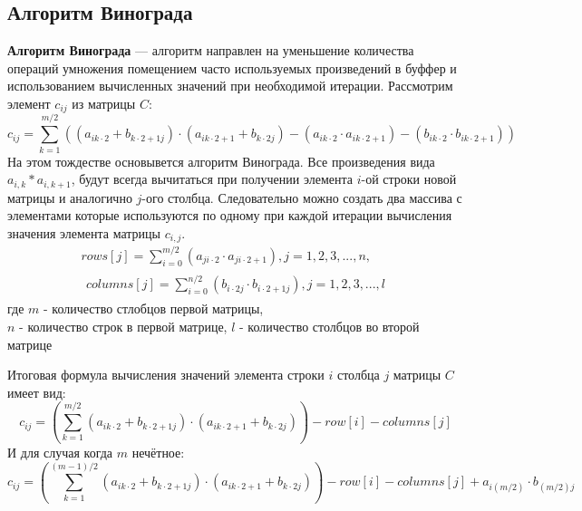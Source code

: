 \documentclass[14pt]{article}
\begin{document}
	\subsection{Алгоритм Винограда}
	\textbf{Алгоритм Винограда} --- алгоритм направлен на уменьшение количества операций умножения помещением часто используемых произведений в буффер и использованием вычисленных значений при необходимой итерации. Рассмотрим элемент  $c_{ij}$ из матрицы $C$:
	\begin{equation}
		c_{ij} = \sum_{k=1}^{m/2} ((a_{ik\cdot 2} + b_{k\cdot 2 + 1j})\cdot (a_{ik\cdot 2+1} + b_{k\cdot 2j}) -
		(a_{ik\cdot 2}\cdot a_{ik\cdot 2+1}) - (b_{ik\cdot 2}\cdot b_{ik\cdot 2+1}))
	\end{equation}
	На этом тождестве основывется алгоритм Винограда. Все произведения вида $a_{i,k}*a_{i,k+1}$, будут всегда вычитаться при получении элемента $i$-ой строки новой матрицы и аналогично $j$-ого столбца. Следовательно можно создать два массива с элементами которые используются по одному при каждой итерации вычисления значения элемента матрицы $c_{i,j}$.
	\begin{gather}
		rows[j] = \sum_{i=0}^{m/2} (a_{ji\cdot2}\cdot a_{ji\cdot 2+1}), j=1,2,3,...,n,\\
		\begin{gathered}
			columns[j] = \sum_{i=0}^{n/2} (b_{i\cdot
				2j}\cdot b_{i\cdot 2+1j}),j=1,2,3,...,l
		\end{gathered}
	\end{gather}
	где $m$ - количество стлобцов первой матрицы,\\
	$n$ - количество строк в первой матрице, $l$ - количество столбцов во второй матрице
	
	Итоговая формула вычисления значений элемента строки $i$ столбца $j$ матрицы $C$ имеет вид:
	\begin{equation}
		c_{ij} = (\sum_{k=1}^{m/2} (a_{ik\cdot 2} + b_{k\cdot 2 + 1j})\cdot (a_{ik\cdot 2+1} + b_{k\cdot 2j})) - row[i] - columns[j]
	\end{equation}
	И для случая когда $m$ нечётное:
	\begin{equation}
		c_{ij} = (\sum_{k=1}^{(m-1)/2} (a_{ik\cdot 2} + b_{k\cdot 2 + 1j})\cdot (a_{ik\cdot 2+1} + b_{k\cdot 2j})) - row[i] - columns[j] + a_{i(m/2)}\cdot b_{(m/2)j}
	\end{equation}
	
\end{document}
